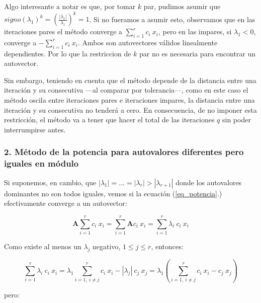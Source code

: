 \vspace{1em}
Algo interesante a notar es que, por tomar $k$ par, pudimos asumir que $signo(\lambda_1)^k = (\frac{|\lambda_{1}|}{\lambda_{1}})^k = 1$. Si no fueramos a asumir esto, observamos que en las iteraciones pares el método converge a $\sum_{i=1}^{r} c_i\ x_i$, pero en las impares, si $\lambda_1 < 0$, converge a $-\sum_{i=1}^{r} c_i\ x_i$. Ambos son autovectores válidos linealmente dependientes. Por lo que la restriccion de $k$ par no es necesaria para encontrar un autovector.

\vspace{1em}
Sin embargo, teniendo en cuenta que el método depende de la distancia entre una iteración y su consecutiva ---al comparar por tolerancia---, como en este caso el método oscila entre iteraciones pares e iteraciones impares, la distancia entre una iteración y su consecutiva no tenderá a cero. En consecuencia, de no imponer esta restricción, el método va a tener que hacer el total de las iteraciones $q$ sin poder interrumpirse antes. 





\vspace{2em}
\subsubsection*{2. Método de la potencia para autovalores diferentes pero iguales en módulo} 

Si suponemos, en cambio, que $|\lambda_1| = ... = |\lambda_r| > |\lambda_{r + 1}|$ donde los autovalores dominantes no son todos iguales, vemos si la ecuación (\ref{eq_potencia}.) efectivamente converge a un autovector:

\begin{equation*}
    \mathbf{A} \sum_{i=1}^{r} c_i\ x_i = \sum_{i=1}^{r} \mathbf{A} c_i\ x_i = \sum_{i=1}^{r} \lambda_i\ c_i\ x_i 
\end{equation*}

\vspace{2em} 
\noindent Como existe al menos un $\lambda_j$ negativo, $1 \leq j \leq r$, entonces:

\begin{equation*}
    \sum_{i=1}^{r} \lambda_i\ c_i\ x_i = \lambda_1 \sum_{i = 1,\ i \neq j}^{r} c_i\ x_i - |\lambda_j|\ c_j\ x_j = \lambda_1 (\sum_{i = 1,\ i \neq j}^{r} c_i\ x_i - c_j\ x_j)
\end{equation*}

\vspace{1em} 
\noindent pero:

